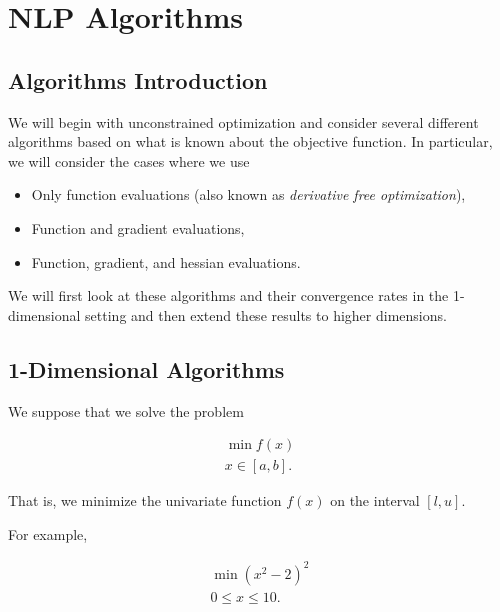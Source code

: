 

%
%
%

\chapter{NLP Algorithms}


\section{Algorithms Introduction}

We will begin with unconstrained optimization and consider several different algorithms based on what is known about the objective function.  In particular, we will consider the cases where we use
\begin{itemize}
\item Only function evaluations (also known as \emph{derivative free optimization}),
\item Function and gradient evaluations,
\item Function, gradient, and hessian evaluations.
\end{itemize}

We will first look at these algorithms and their convergence rates in the 1-dimensional setting and then extend these results to higher dimensions.

\section{1-Dimensional Algorithms}
We suppose that we solve the problem 

\begin{align}
\min f(x)\\
x \in [a,b].
\end{align}

That is, we minimize the univariate function $f(x)$ on the interval $[l,u]$.  

For example, 

\begin{align}
\min (x^2 - 2)^2\\
 0 \leq x \leq 10.
\end{align}

